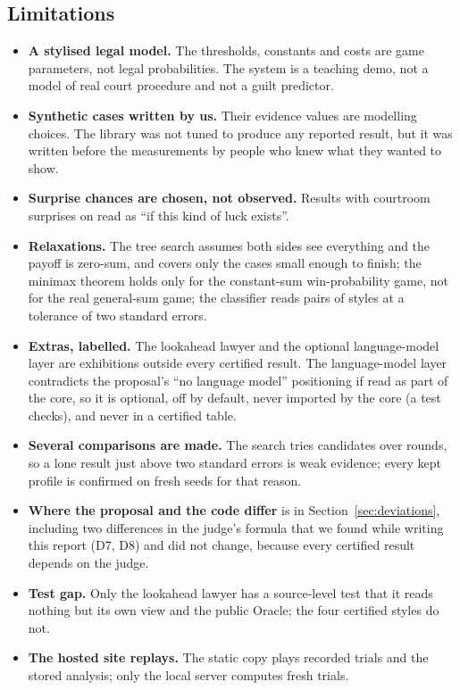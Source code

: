 \subsection{Limitations}
\begin{itemize}
\item \textbf{A stylised legal model.} The thresholds, constants and costs are game parameters, not legal probabilities. The system is a teaching demo, not a model of real court procedure and not a guilt predictor.
\item \textbf{Synthetic cases written by us.} Their evidence values are modelling choices. The library was not tuned to produce any reported result, but it was written before the measurements by people who knew what they wanted to show.
\item \textbf{Surprise chances are chosen, not observed.} Results with courtroom surprises on read as ``if this kind of luck exists''.
\item \textbf{Relaxations.} The tree search assumes both sides see everything and the payoff is zero-sum, and covers only the cases small enough to finish; the minimax theorem holds only for the constant-sum win-probability game, not for the real general-sum game; the classifier reads pairs of styles at a tolerance of two standard errors.
\item \textbf{Extras, labelled.} The lookahead lawyer and the optional language-model layer are exhibitions outside every certified result. The language-model layer contradicts the proposal's ``no language model'' positioning if read as part of the core, so it is optional, off by default, never imported by the core (a test checks), and never in a certified table.
\item \textbf{Several comparisons are made.} The search tries candidates over rounds, so a lone result just above two standard errors is weak evidence; every kept profile is confirmed on fresh seeds for that reason.
\item \textbf{Where the proposal and the code differ} is in Section~\ref{sec:deviations}, including two differences in the judge's formula that we found while writing this report (D7, D8) and did not change, because every certified result depends on the judge.
\item \textbf{Test gap.} Only the lookahead lawyer has a source-level test that it reads nothing but its own view and the public Oracle; the four certified styles do not.
\item \textbf{The hosted site replays.} The static copy plays recorded trials and the stored analysis; only the local server computes fresh trials.
\end{itemize}


